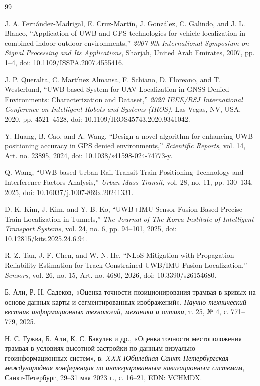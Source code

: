\documentclass{misisarticle}
\begin{document}
\begin{thebibliography}{99}

J. A. Fern\'andez-Madrigal, E. Cruz-Mart\'in, J. Gonz\'alez, C. Galindo, and J. L. Blanco,
``Application of UWB and GPS technologies for vehicle localization in combined indoor-outdoor environments,''
\textit{2007 9th International Symposium on Signal Processing and Its Applications},
Sharjah, United Arab Emirates, 2007, pp. 1--4, doi: 10.1109/ISSPA.2007.4555416.

J. P. Queralta, C. Mart\'inez Almansa, F. Schiano, D. Floreano, and T. Westerlund,
``UWB-based System for UAV Localization in GNSS-Denied Environments: Characterization and Dataset,''
\textit{2020 IEEE/RSJ International Conference on Intelligent Robots and Systems (IROS)},
Las Vegas, NV, USA, 2020, pp. 4521--4528, doi: 10.1109/IROS45743.2020.9341042.

Y. Huang, B. Cao, and A. Wang,
``Design a novel algorithm for enhancing UWB positioning accuracy in GPS denied environments,''
\textit{Scientific Reports}, vol. 14, Art. no. 23895, 2024, doi: 10.1038/s41598-024-74773-y.

Q. Wang,
``UWB-based Urban Rail Transit Train Positioning Technology and Interference Factors Analysis,''
\textit{Urban Mass Transit}, vol. 28, no. 11, pp. 130--134, 2025,
doi: 10.16037/j.1007-869x.20241331.

D.-K. Kim, J. Kim, and Y.-B. Ko,
``UWB+IMU Sensor Fusion Based Precise Train Localization in Tunnels,''
\textit{The Journal of The Korea Institute of Intelligent Transport Systems},
vol. 24, no. 6, pp. 94--101, 2025, doi: 10.12815/kits.2025.24.6.94.

R.-Z. Tan, J.-F. Chen, and W.-N. He,
``NLoS Mitigation with Propagation Reliability Estimation for Track-Constrained UWB/IMU Fusion Localization,''
\textit{Sensors}, vol. 26, no. 15, Art. no. 4680, 2026, doi: 10.3390/s26154680.

Б. Али, Р. Н. Садеков,
«Оценка точности позиционирования трамвая в кривых на основе данных карты и сегментированных изображений»,
\textit{Научно-технический вестник информационных технологий, механики и оптики},
т. 25, № 4, с. 771--779, 2025.

Н. С. Гужва, Б. Али, К. С. Бакулев и др.,
«Оценка точности местоположения трамвая в условиях высотной застройки по данным визуально-геоинформационных систем»,
в: \textit{XXX Юбилейная Санкт-Петербургская международная конференция по интегрированным навигационным системам},
Санкт-Петербург, 29--31 мая 2023 г., с. 16--21, EDN: VCHMDX.


\end{thebibliography}
\end{document}
